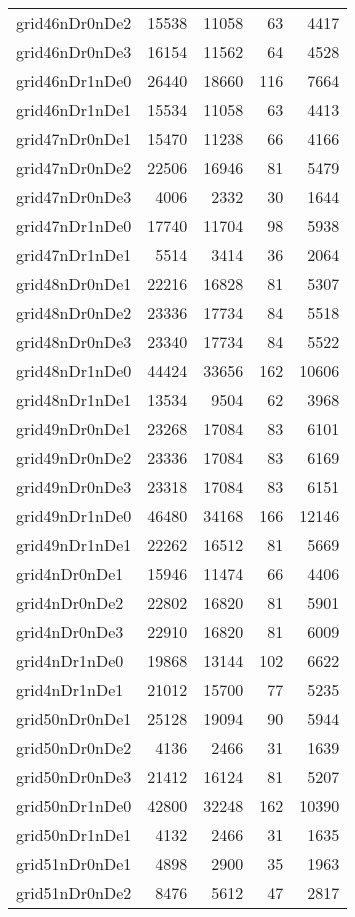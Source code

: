 \begin{tabular}{lrrrr}
grid46nDr0nDe2 & 15538 & 11058 & 63 & 4417 \\
grid46nDr0nDe3 & 16154 & 11562 & 64 & 4528 \\
grid46nDr1nDe0 & 26440 & 18660 & 116 & 7664 \\
grid46nDr1nDe1 & 15534 & 11058 & 63 & 4413 \\
grid47nDr0nDe1 & 15470 & 11238 & 66 & 4166 \\
grid47nDr0nDe2 & 22506 & 16946 & 81 & 5479 \\
grid47nDr0nDe3 & 4006 & 2332 & 30 & 1644 \\
grid47nDr1nDe0 & 17740 & 11704 & 98 & 5938 \\
grid47nDr1nDe1 & 5514 & 3414 & 36 & 2064 \\
grid48nDr0nDe1 & 22216 & 16828 & 81 & 5307 \\
grid48nDr0nDe2 & 23336 & 17734 & 84 & 5518 \\
grid48nDr0nDe3 & 23340 & 17734 & 84 & 5522 \\
grid48nDr1nDe0 & 44424 & 33656 & 162 & 10606 \\
grid48nDr1nDe1 & 13534 & 9504 & 62 & 3968 \\
grid49nDr0nDe1 & 23268 & 17084 & 83 & 6101 \\
grid49nDr0nDe2 & 23336 & 17084 & 83 & 6169 \\
grid49nDr0nDe3 & 23318 & 17084 & 83 & 6151 \\
grid49nDr1nDe0 & 46480 & 34168 & 166 & 12146 \\
grid49nDr1nDe1 & 22262 & 16512 & 81 & 5669 \\
grid4nDr0nDe1 & 15946 & 11474 & 66 & 4406 \\
grid4nDr0nDe2 & 22802 & 16820 & 81 & 5901 \\
grid4nDr0nDe3 & 22910 & 16820 & 81 & 6009 \\
grid4nDr1nDe0 & 19868 & 13144 & 102 & 6622 \\
grid4nDr1nDe1 & 21012 & 15700 & 77 & 5235 \\
grid50nDr0nDe1 & 25128 & 19094 & 90 & 5944 \\
grid50nDr0nDe2 & 4136 & 2466 & 31 & 1639 \\
grid50nDr0nDe3 & 21412 & 16124 & 81 & 5207 \\
grid50nDr1nDe0 & 42800 & 32248 & 162 & 10390 \\
grid50nDr1nDe1 & 4132 & 2466 & 31 & 1635 \\
grid51nDr0nDe1 & 4898 & 2900 & 35 & 1963 \\
grid51nDr0nDe2 & 8476 & 5612 & 47 & 2817 \\

\end{tabular}
